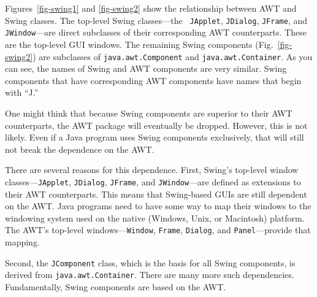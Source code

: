 \begin{figure}[tb]
\end{figure}

Figures~\ref{fig-swing1} and \ref{fig-swing2} show the relationship
between AWT and Swing classes. The top-level Swing classes---the {\tt
JApplet}, {\tt JDialog}, {\tt JFrame}, and {\tt JWindow}---are direct
subclasses of their corresponding AWT counterparts. These are the
top-level GUI windows. The remaining Swing components
(Fig.~\ref{fig-swing2}) are subclasses of {\tt java.awt.Component}
and {\tt java.awt.Container}.  As you can see, the names of Swing and
AWT components are very similar. Swing components that have
corresponding AWT components have names that begin with ``J.''

One might think that because Swing components are superior
to their AWT counterparts, the AWT package will eventually be dropped.
However, this is not likely. Even if a Java program uses Swing
components exclusively, that will still not break the dependence on
the AWT.

\begin{figure}[tb]
\end{figure}

There are several reasons for this dependence. First, Swing's
top-level window classes---{\tt JApplet}, {\tt JDialog}, {\tt JFrame},
and {\tt JWindow}---are defined as extensions to their AWT
counterparts.  This means that Swing-based GUIs are still dependent on
the AWT. Java programs need to have some way to map their windows to
the windowing system used on the native (Windows, Unix, or Macintosh)
platform.  The AWT's top-level windows---{\tt Window}, {\tt Frame},
{\tt Dialog}, and {\tt Panel}---provide that mapping.

Second, the {\tt JComponent} class, which is the basis for all Swing
components, is derived from {\tt java.awt.Container}. There are many
more such dependencies.  Fundamentally, Swing components are based on
the AWT.

